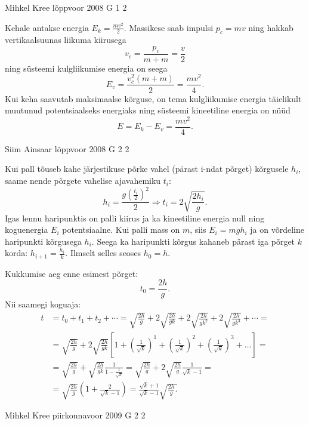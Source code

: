 \documentclass[11pt, twoside]{article}
\begin{document}
{%
{Mihkel Kree} %
{lõppvoor} %
{2008} %
{G 1} %
{2} %
{

\ifSolution
Kehale antakse energia $E_k = \frac{mv^2}{2}$. Massikese saab impulsi $p_c = mv$ ning hakkab vertikaalsuunas liikuma kiirusega
\[
v_{c}=\frac{p_{c}}{m+m}=\frac{v}{2}
\]
ning süsteemi kulgliikumise energia on seega
\[
E_{v}=\frac{v_{c}^{2}(m+m)}{2}=\frac{m v^{2}}{4}.
\]
Kui keha saavutab maksimaalse kõrguse, on tema kulgliikumise energia täielikult muutunud potentsiaalseks energiaks ning süsteemi kineetiline energia on nüüd
\[
E = E_k - E_v = \frac{mv^2}{4}.
\]
\fi
}

{Siim Ainsaar} %
{lõppvoor} %
{2008} %
{G 2} %
{2} %
{

\ifSolution
Kui pall tõuseb kahe järjestikuse põrke vahel (pärast i-ndat põrget) kõrgusele $h_i$, saame nende põrgete vahelise ajavahemiku $t_i$:
\[
h_{i}=\frac{g\left(\frac{t_{i}}{2}\right)^{2}}{2} \Longrightarrow t_{i}=2 \sqrt{\frac{2 h_{i}}{g}}.
\]
Igas lennu haripunktis on palli kiirus ja ka kineetiline energia null ning koguenergia $E_i$ potentsiaalne. Kui palli mass on $m$, siis $E_i = mgh_i$ ja on võrdeline haripunkti kõrgusega $h_i$. Seega ka haripunkti kõrgus kahaneb pärast iga põrget $k$ korda: $h_{i+1} = \frac{h_i}{k}$. Ilmselt selles seoses $h_0 = h$.

Kukkumise aeg enne esimest põrget:
\[
t_0 = \frac{2h}{g}.
\]
Nii saamegi koguaja:
\[
\begin{aligned} 
	t &=t_{0}+t_{1}+t_{2}+\cdots=\sqrt{\frac{2 h}{g}}+2 \sqrt{\frac{2 h}{g k}} + 2 \sqrt{\frac{2 h}{g k^{2}}}+2 \sqrt{\frac{2 h}{g k^{3}}}+\cdots=\\ &=\sqrt{\frac{2 h}{g}}+2 \sqrt{\frac{2 h}{g k}}\left[1+\left(\frac{1}{\sqrt{k}}\right)^{1}+\left(\frac{1}{\sqrt{k}}\right)^{2}+\left(\frac{1}{\sqrt{k}}\right)^{3}+\ldots\right]=\\ &=\sqrt{\frac{2 h}{g}}+\sqrt{\frac{2 h}{g k}} \frac{1}{1-\frac{1}{\sqrt{k}}}=\sqrt{\frac{2 h}{g}}+2 \sqrt{\frac{2 h}{g}} \frac{1}{\sqrt{k}-1}=\\ &=\sqrt{\frac{2 h}{g}}\left(1+\frac{2}{\sqrt{k}-1}\right)=\frac{\sqrt{k}+1}{\sqrt{k}-1} \sqrt{\frac{2 h}{g}.} 
\end{aligned}
\]
\fi
}

{Mihkel Kree} %
{piirkonnavoor} %
{2009} %
{G 2} %
{2} %
{

}}
\end{document}
